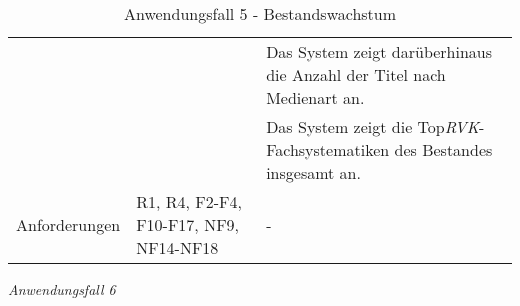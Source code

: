\begin{table}[H]
\begin{adjustbox}{max width=\textwidth}
\begin{tabular}{lp{7.0cm}p{7.0cm}}
                                         & &Das System zeigt darüberhinaus die Anzahl der Titel nach Medienart an.\\
                                         & &Das System zeigt die Top\textit{\acrshort{RVK}}-Fachsystematiken des Bestandes insgesamt an.\\

        Anforderungen                   &R1, R4, F2-F4, F10-F17, NF9, NF14-NF18& -\\
        \bottomrule
    \end{tabular}
    \end{adjustbox}
    \caption{%
    Anwendungsfall 5 - Bestandswachstum   }
    \label{tab:AF_Bestandswachstum}
    \end{table}
\endgroup


\clearpage
\noindent
\textit{Anwendungsfall 6}

